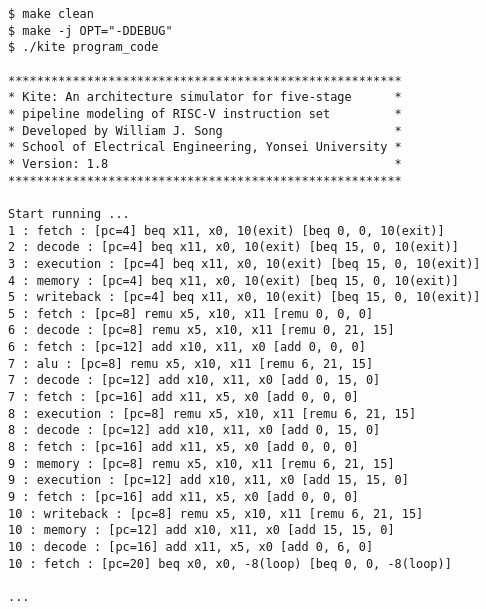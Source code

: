 \documentclass[10pt]{article}
\begin{document}
\begin{Verbatim}[frame=single,fontsize=\small]
$ make clean
$ make -j OPT="-DDEBUG" 
$ ./kite program_code

*******************************************************
* Kite: An architecture simulator for five-stage      *
* pipeline modeling of RISC-V instruction set         *
* Developed by William J. Song                        *
* School of Electrical Engineering, Yonsei University *
* Version: 1.8                                        *
*******************************************************

Start running ...
1 : fetch : [pc=4] beq x11, x0, 10(exit) [beq 0, 0, 10(exit)]
2 : decode : [pc=4] beq x11, x0, 10(exit) [beq 15, 0, 10(exit)]
3 : execution : [pc=4] beq x11, x0, 10(exit) [beq 15, 0, 10(exit)]
4 : memory : [pc=4] beq x11, x0, 10(exit) [beq 15, 0, 10(exit)]
5 : writeback : [pc=4] beq x11, x0, 10(exit) [beq 15, 0, 10(exit)]
5 : fetch : [pc=8] remu x5, x10, x11 [remu 0, 0, 0]
6 : decode : [pc=8] remu x5, x10, x11 [remu 0, 21, 15]
6 : fetch : [pc=12] add x10, x11, x0 [add 0, 0, 0]
7 : alu : [pc=8] remu x5, x10, x11 [remu 6, 21, 15]
7 : decode : [pc=12] add x10, x11, x0 [add 0, 15, 0]
7 : fetch : [pc=16] add x11, x5, x0 [add 0, 0, 0]
8 : execution : [pc=8] remu x5, x10, x11 [remu 6, 21, 15]
8 : decode : [pc=12] add x10, x11, x0 [add 0, 15, 0]
8 : fetch : [pc=16] add x11, x5, x0 [add 0, 0, 0]
9 : memory : [pc=8] remu x5, x10, x11 [remu 6, 21, 15]
9 : execution : [pc=12] add x10, x11, x0 [add 15, 15, 0]
9 : fetch : [pc=16] add x11, x5, x0 [add 0, 0, 0]
10 : writeback : [pc=8] remu x5, x10, x11 [remu 6, 21, 15]
10 : memory : [pc=12] add x10, x11, x0 [add 15, 15, 0]
10 : decode : [pc=16] add x11, x5, x0 [add 0, 6, 0]
10 : fetch : [pc=20] beq x0, x0, -8(loop) [beq 0, 0, -8(loop)]

...
\end{Verbatim}
\end{document}
